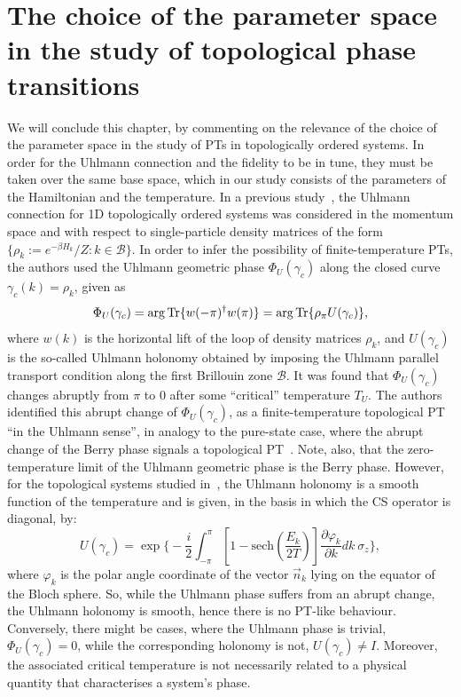 \section{The choice of the parameter space in the study of topological phase transitions}
\label{sec:space}
We will conclude this chapter, by commenting on the relevance of the choice of the parameter space in the study of PTs in topologically ordered systems.
In order for the Uhlmann connection and the fidelity to be in tune, they must be taken over the same base space, which in our study consists of the parameters of the Hamiltonian and the temperature. In a previous study~\cite{viy:riv:del:14}, the Uhlmann connection for 1D topologically ordered systems was considered in the momentum space and with respect to single-particle density matrices of the form $\{\rho_k:=e^{-\beta H_k}/Z: k\in \mathcal B \}$. In order to infer the possibility of finite-temperature PTs, the authors used the Uhlmann geometric phase $\Phi_U(\gamma_c)$ along the closed curve $\gamma_c(k)=\rho_k$, given as 
\[
\Phi_U(\gamma_c)=\arg\text{Tr}\{w(-\pi)^{\dagger}w(\pi)\} =\arg\text{Tr}\{\rho_{\pi}U(\gamma_c)\},
\]
where $w(k)$ is the horizontal lift of the loop of density matrices $\rho_{k}$, and $U(\gamma_c)$ is the so-called Uhlmann holonomy obtained by imposing the Uhlmann parallel transport condition along the first Brillouin zone $\mathcal B$.
It was found that $\Phi_U(\gamma_c)$ changes abruptly from $\pi$ to $0$ after some ``critical'' temperature $T_U$. The authors identified this abrupt change of $\Phi_U(\gamma_c)$, as a finite-temperature topological PT ``in the Uhlmann sense'', in analogy to the pure-state case, where the abrupt change of the Berry phase signals a topological PT~\cite{ber:84}. Note, also, that the zero-temperature limit of the Uhlmann geometric phase is the Berry phase. However, for the topological systems studied in~\cite{viy:riv:del:14}, the Uhlmann holonomy is a smooth function of the temperature and is given, in the basis in which the CS operator is diagonal, by:
\label{eq:hol}
\[
U(\gamma_c) = \exp \Big\{-\frac{i}{2} \int_{-\pi}^{\pi} \left[1 - \text{sech} \left(\frac{E_k}{2T}\right)\right]\frac{\partial \varphi_k}{\partial k}dk\  \sigma_z\Big\},
\]
where $\varphi_k$ is the polar angle coordinate of the vector $\vec{n}_k$ lying on the equator of the Bloch sphere.  So, while the Uhlmann phase suffers from an abrupt change, the Uhlmann holonomy is smooth, hence there is no PT-like behaviour. Conversely, there might be cases, where the Uhlmann phase is trivial, $\Phi_U(\gamma_c) = 0$, while the corresponding holonomy is not, $U(\gamma_c)\neq I$.
Moreover, the associated critical temperature is not necessarily related to a physical quantity that characterises a system's phase.\\


